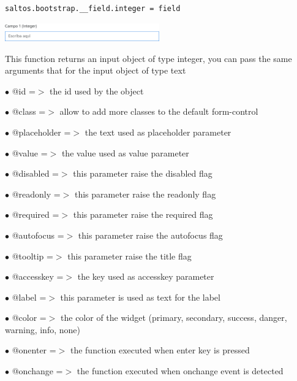 \documentclass[a4paper]{article}
\begin{document}
\begin{lstlisting}
saltos.bootstrap.__field.integer = field
\end{lstlisting}

\begin{center}\includegraphics[width=0.5\textwidth]{../ujest/snaps/test-bootstrap-js-bootstrap-campo-1-integer-1-snap.png}\end{center}

This function returns an input object of type integer, you can pass the same arguments
that for the input object of type text

\begin{compactitem}
\item[\color{myblue}$\bullet$] @id          =$>$ the id used by the object
\item[\color{myblue}$\bullet$] @class       =$>$ allow to add more classes to the default form-control
\item[\color{myblue}$\bullet$] @placeholder =$>$ the text used as placeholder parameter
\item[\color{myblue}$\bullet$] @value       =$>$ the value used as value parameter
\item[\color{myblue}$\bullet$] @disabled    =$>$ this parameter raise the disabled flag
\item[\color{myblue}$\bullet$] @readonly    =$>$ this parameter raise the readonly flag
\item[\color{myblue}$\bullet$] @required    =$>$ this parameter raise the required flag
\item[\color{myblue}$\bullet$] @autofocus   =$>$ this parameter raise the autofocus flag
\item[\color{myblue}$\bullet$] @tooltip     =$>$ this parameter raise the title flag
\item[\color{myblue}$\bullet$] @accesskey   =$>$ the key used as accesskey parameter
\item[\color{myblue}$\bullet$] @label       =$>$ this parameter is used as text for the label
\item[\color{myblue}$\bullet$] @color       =$>$ the color of the widget (primary, secondary, success, danger, warning, info, none)
\item[\color{myblue}$\bullet$] @onenter     =$>$ the function executed when enter key is pressed
\item[\color{myblue}$\bullet$] @onchange    =$>$ the function executed when onchange event is detected
\end{compactitem}
\end{document}

